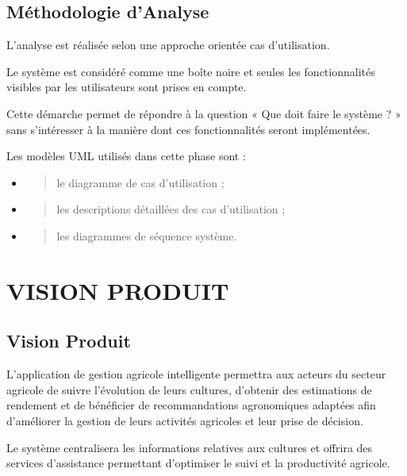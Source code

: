 \hypertarget{muxe9thodologie-danalyse}{%
\section{Méthodologie d'Analyse}\label{muxe9thodologie-danalyse}}

L'analyse est réalisée selon une approche orientée cas d'utilisation.

Le système est considéré comme une boîte noire et seules les
fonctionnalités visibles par les utilisateurs sont prises en compte.

Cette démarche permet de répondre à la question « Que doit faire le
système ? » sans s'intéresser à la manière dont ces fonctionnalités
seront implémentées.

Les modèles UML utilisés dans cette phase sont :

\begin{itemize}
\item
  \begin{quote}
  le diagramme de cas d'utilisation ;
  \end{quote}
\item
  \begin{quote}
  les descriptions détaillées des cas d'utilisation ;
  \end{quote}
\item
  \begin{quote}
  les diagrammes de séquence système.
  \end{quote}
\end{itemize}

\hypertarget{chapitre-2-vision-produit}{%
\chapter{VISION PRODUIT}\label{chapitre-2-vision-produit}}

\hypertarget{vision-produit}{%
\section{Vision Produit}\label{vision-produit}}

L'application de gestion agricole intelligente permettra aux acteurs du
secteur agricole de suivre l'évolution de leurs cultures, d'obtenir des
estimations de rendement et de bénéficier de recommandations
agronomiques adaptées afin d'améliorer la gestion de leurs activités
agricoles et leur prise de décision.

Le système centralisera les informations relatives aux cultures et
offrira des services d'assistance permettant d'optimiser le suivi et la
productivité agricole.

